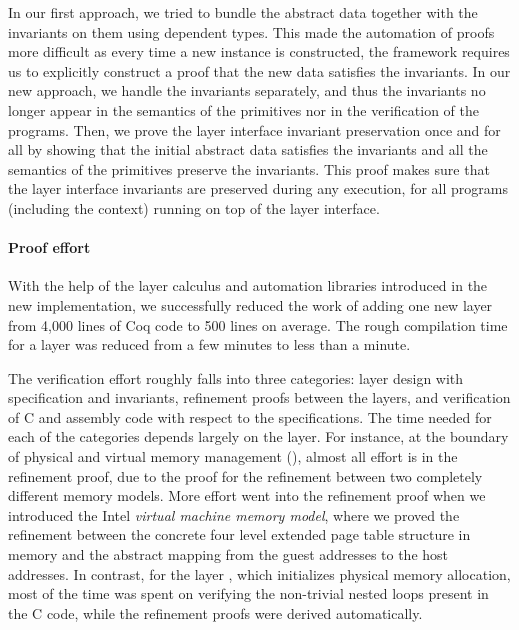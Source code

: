 In our first approach, we tried to bundle the abstract data together
with the invariants on them using dependent types. This made the
automation of proofs more difficult as every time a new instance is
constructed, the framework requires us to explicitly construct a proof
that the new data satisfies the invariants. In our new approach, we
handle the invariants separately, and thus the invariants no longer
appear in the semantics of the primitives nor in the verification of
the programs. Then, we prove the layer interface invariant
preservation once and for all by showing that the initial abstract
data satisfies the invariants and all the semantics of the primitives
preserve the invariants. This proof makes sure that the layer
interface invariants are preserved during any execution, for all
programs (including the context) running on top of the layer
interface.


\paragraph{Proof effort}
With the help of the layer calculus and automation libraries
introduced in the new implementation, we successfully reduced the work
of adding one new layer from 4,000 lines of Coq code to 500 lines on
average.  The rough compilation time for a layer was reduced from a
few minutes to less than a minute.

The verification effort roughly falls into three categories: layer
design with specification and invariants, refinement proofs between
the layers, and verification of C and assembly code with respect to
the specifications. The time needed for each of the categories depends
largely on the layer.  For instance, at the boundary of physical and
virtual memory management ({}), almost all effort
is in the refinement proof, due to the proof for the refinement between
two completely different memory models. More effort went into the
refinement proof when we introduced the Intel \emph{virtual machine
memory model}, where we proved the refinement between the concrete
four level extended page table structure in memory and the abstract
mapping from the guest addresses to the host addresses.
In contrast, for the layer {},
which initializes physical memory allocation,
most of the time was spent on verifying
the non-trivial nested loops present in the C code,
while the refinement proofs were derived automatically. 

